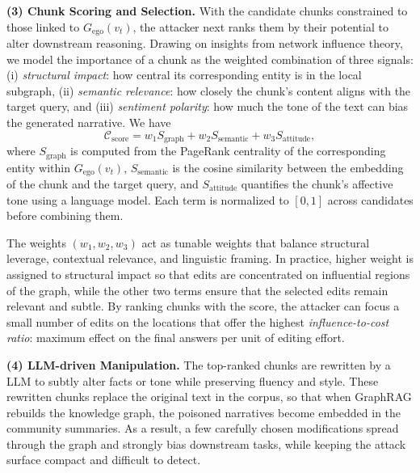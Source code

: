 \documentclass[letterpaper]{article} %
\begin{document}
\textbf{(3) Chunk Scoring and Selection.}
With the candidate chunks constrained to those linked to \(G_{\mathrm{ego}}(v_t)\),
the attacker next ranks them by their potential to alter downstream reasoning.
Drawing on insights from network influence theory, we model the importance of a chunk as the weighted combination of three signals:
(i) \emph{structural impact}: how central its corresponding entity is in the local subgraph,
(ii) \emph{semantic relevance}: how closely the chunk's content aligns with the target query,
and (iii) \emph{sentiment polarity}: how much the tone of the text can bias the generated narrative.
We have
\begin{equation}
    \mathcal{C}_\mathrm{score} = w_1 S_{\mathrm{graph}} + w_2 S_{\mathrm{semantic}} + w_3 S_{\mathrm{attitude}},
\end{equation}
where \(S_{\mathrm{graph}}\) is computed from the PageRank centrality of the corresponding entity within \(G_{\mathrm{ego}}(v_t)\),
\(S_{\mathrm{semantic}}\) is the cosine similarity between the embedding of the chunk and the target query,
and \(S_{\mathrm{attitude}}\) quantifies the chunk's affective tone using a language model.
Each term is normalized to \([0,1]\) across candidates before combining them.

The weights \((w_1,w_2,w_3)\) act as tunable weights that balance structural leverage,
contextual relevance, and linguistic framing.
In practice, higher weight is assigned to structural impact so that edits are concentrated on influential regions of the graph,
while the other two terms ensure that the selected edits remain relevant and subtle.
By ranking chunks with the score, the attacker can focus a small number of edits on the locations that offer the highest
\emph{influence-to-cost ratio}: maximum effect on the final answers per unit of editing effort.

\textbf{(4) LLM-driven Manipulation.}
The top-ranked chunks are rewritten by a LLM to subtly alter facts or tone while preserving fluency and style.
These rewritten chunks replace the original text in the corpus, so that when GraphRAG rebuilds the knowledge graph,
the poisoned narratives become embedded in the community summaries. As a result, a few carefully chosen modifications spread through the graph and strongly bias downstream tasks,
while keeping the attack surface compact and difficult to detect.


\end{document}
